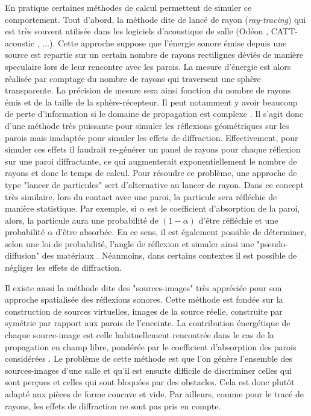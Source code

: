 En pratique certaines méthodes de calcul permettent de simuler ce comportement. Tout d'abord, la méthode dite de lancé de rayon (\textit{ray-tracing})\cite[p.449-468]{raytracing} qui est très souvent utilisée dans les logiciels d'acoustique de salle (Odéon \cite[page web]{odeon}, CATT-acoustic \cite[page web]{catt}, ...). Cette approche suppose que l’énergie sonore émise depuis une source est repartie sur un certain nombre de rayons rectilignes déviés de manière \gls{speculaire} lors de leur rencontre avec les parois. La mesure d'énergie est alors réalisée par comptage du nombre de rayons qui traversent une sphère transparente. La précision de mesure sera ainsi fonction du nombre de rayons émis et de la taille de la sphère-récepteur. Il peut notamment y avoir beaucoup de perte d'information si le domaine de propagation est complexe \cite[p. 60]{picaut}. Il s'agit donc d'une méthode très puissante pour simuler les réflexions géométriques sur les parois mais inadaptée pour simuler les effets de diffraction. Effectivement, pour simuler ces effets il faudrait re-générer un panel de rayons pour chaque réflexion sur une paroi diffractante, ce qui augmenterait exponentiellement le nombre de rayons et donc le temps de calcul. Pour résoudre ce problème, une approche de type "lancer de particules" sert d'alternative au lancer de rayon. Dans ce concept très similaire, lors du contact avec une paroi, la particule sera réfléchie de manière statistique. Par exemple, si $\alpha$ est le coefficient d'absorption de la paroi, alors, la particule aura une probabilité de $(1-\alpha)$ d'être réfléchie et une probabilité $\alpha$ d'être absorbée. En ce sens, il est également possible de déterminer, selon une loi de probabilité, l'angle de réflexion et simuler ainsi une "pseudo-diffusion" des matériaux \cite[p. 62]{picaut}. Néanmoins, dans certains contextes il est possible de négliger les effets de diffraction.


Il existe aussi la méthode dite des "sources-images" \cite[p.6]{jouhaneau} très appréciée pour son approche spatialisée des réflexions sonores. Cette méthode est fondée sur la construction de sources virtuelles, images de la source réelle, construite par symétrie par rapport aux parois de l'enceinte. La contribution énergétique de chaque source-image est celle habituellement rencontrée dans le cas de la propagation en champ libre, pondérée par le coefficient d’absorption des parois considérées \cite[p. 60]{picaut}.
Le problème de cette méthode est que l'on génère l'ensemble des sources-images d'une salle et qu'il est ensuite difficile de discriminer celles qui sont perçues et celles qui sont bloquées par des obstacles. Cela est donc plutôt adapté aux pièces de forme concave et vide. Par ailleurs, comme pour le tracé de rayons, les effets de diffraction ne sont pas pris en compte. 


